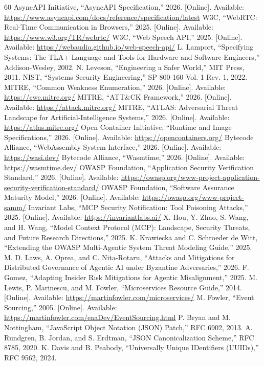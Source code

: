 \documentclass[12pt,journal,onecolumn,draftclsnofoot]{IEEEtran}
\begin{document}
\begin{thebibliography}{60}
 AsyncAPI Initiative, ``AsyncAPI Specification,'' 2026. [Online]. Available: \url{https://www.asyncapi.com/docs/reference/specification/latest}
 W3C, ``WebRTC: Real-Time Communication in Browsers,'' 2025. [Online]. Available: \url{https://www.w3.org/TR/webrtc/}
 W3C, ``Web Speech API,'' 2025. [Online]. Available: \url{https://webaudio.github.io/web-speech-api/}
 L. Lamport, ``Specifying Systems: The TLA+ Language and Tools for Hardware and Software Engineers,'' Addison-Wesley, 2002.
 N. Leveson, ``Engineering a Safer World,'' MIT Press, 2011.
 NIST, ``Systems Security Engineering,'' SP 800-160 Vol. 1 Rev. 1, 2022.
 MITRE, ``Common Weakness Enumeration,'' 2026. [Online]. Available: \url{https://cwe.mitre.org/}
 MITRE, ``ATT\&CK Framework,'' 2026. [Online]. Available: \url{https://attack.mitre.org/}
 MITRE, ``ATLAS: Adversarial Threat Landscape for Artificial-Intelligence Systems,'' 2026. [Online]. Available: \url{https://atlas.mitre.org/}
 Open Container Initiative, ``Runtime and Image Specifications,'' 2026. [Online]. Available: \url{https://opencontainers.org/}
 Bytecode Alliance, ``WebAssembly System Interface,'' 2026. [Online]. Available: \url{https://wasi.dev/}
 Bytecode Alliance, ``Wasmtime,'' 2026. [Online]. Available: \url{https://wasmtime.dev/}
 OWASP Foundation, ``Application Security Verification Standard,'' 2026. [Online]. Available: \url{https://owasp.org/www-project-application-security-verification-standard/}
 OWASP Foundation, ``Software Assurance Maturity Model,'' 2026. [Online]. Available: \url{https://owasp.org/www-project-samm/}
 Invariant Labs, ``MCP Security Notification: Tool Poisoning Attacks,'' 2025. [Online]. Available: \url{https://invariantlabs.ai/}
 X. Hou, Y. Zhao, S. Wang, and H. Wang, ``Model Context Protocol (MCP): Landscape, Security Threats, and Future Research Directions,'' 2025.
 K. Krawiecka and C. Schroeder de Witt, ``Extending the OWASP Multi-Agentic System Threat Modeling Guide,'' 2025.
 M. D. Laws, A. Oprea, and C. Nita-Rotaru, ``Attacks and Mitigations for Distributed Governance of Agentic AI under Byzantine Adversaries,'' 2026.
 F. Gomez, ``Adapting Insider Risk Mitigations for Agentic Misalignment,'' 2025.
 M. Lewis, P. Marinescu, and M. Fowler, ``Microservices Resource Guide,'' 2014. [Online]. Available: \url{https://martinfowler.com/microservices/}
 M. Fowler, ``Event Sourcing,'' 2005. [Online]. Available: \url{https://martinfowler.com/eaaDev/EventSourcing.html}
 P. Bryan and M. Nottingham, ``JavaScript Object Notation (JSON) Patch,'' RFC 6902, 2013.
 A. Rundgren, B. Jordan, and S. Erdtman, ``JSON Canonicalization Scheme,'' RFC 8785, 2020.
 K. Davis and B. Peabody, ``Universally Unique IDentifiers (UUIDs),'' RFC 9562, 2024.
\end{thebibliography}
\end{document}
